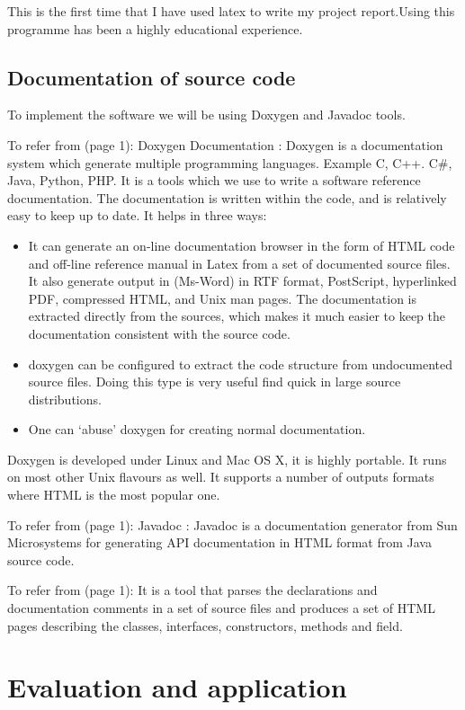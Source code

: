 \documentclass{report}
\begin{document}
This is the first time that I have used latex to write my project report.Using this programme has been a highly educational experience. 



\subsection{Documentation of source code}
\label{sec:documentsource}

To implement the software we will be using Doxygen and Javadoc tools. 

To refer from \cite{Doxygen}(page 1): Doxygen Documentation : Doxygen is a documentation system which generate multiple programming languages. Example C, C++. C#, Java, Python, PHP. It is a tools which we use to write a software reference documentation. The documentation is written within the code, and is relatively easy to keep up to date.
It helps in three ways: 
\begin{itemize}
\item It can generate an on-line documentation browser in the form of HTML code and off-line reference manual in Latex from a set of documented source files. It also generate output in (Ms-Word) in RTF format, PostScript, hyperlinked PDF, compressed HTML, and Unix man pages. The documentation is extracted directly from the sources, which makes it much easier to keep the documentation consistent with the source code.
\item doxygen can be configured to extract the code structure from undocumented source files. Doing this type is very useful find quick in large source distributions.
\item One can `abuse' doxygen for creating normal documentation.
\end{itemize}
Doxygen is developed under Linux and Mac OS X, it is highly portable. It runs on most other Unix flavours as well. It supports a number of outputs formats where HTML is the most popular one. 

To refer from \cite{Wikipedia_Javadoc}(page 1):  Javadoc : Javadoc is a documentation generator from Sun Microsystems  for generating API documentation in HTML format from Java source code. 

To refer from \cite{Javadoc}(page 1):  It is a tool that parses the declarations and documentation comments in a set of source files and produces a set of HTML pages describing the classes, interfaces, constructors, methods and field. 

\section{Evaluation and application}
\label{sec:eval}
\end{document}
